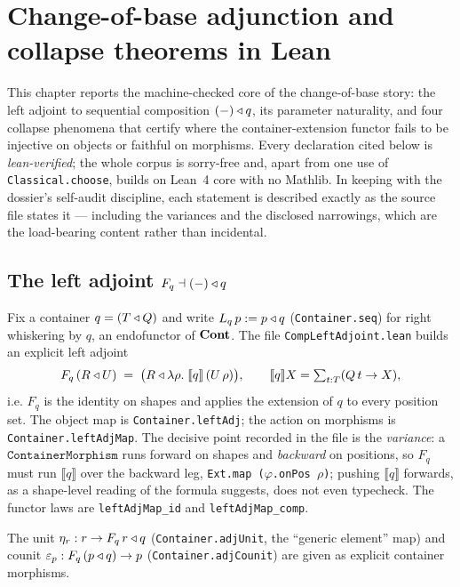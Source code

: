 \chapter{Change-of-base adjunction and collapse theorems in Lean}
\label{ch:leancob}

This chapter reports the machine-checked core of the change-of-base story: the left adjoint to sequential composition $(-)\triangleleft q$, its parameter naturality, and four collapse phenomena that certify where the container-extension functor fails to be injective on objects or faithful on morphisms. Every declaration cited below is \emph{lean-verified}; the whole corpus is sorry-free and, apart from one use of \texttt{Classical.choose}, builds on Lean~4 core with no Mathlib. In keeping with the dossier's self-audit discipline, each statement is described exactly as the source file states it --- including the variances and the disclosed narrowings, which are the load-bearing content rather than incidental.


\section{The left adjoint $F_q \dashv (-)\triangleleft q$}
\label{sec:leancob-fq}

Fix a container $q=(T\triangleleft Q)$ and write $L_q\,p := p\triangleleft q$ (\texttt{Container.seq}) for right whiskering by $q$, an endofunctor of $\mathbf{Cont}$. The file \texttt{CompLeftAdjoint.lean} builds an explicit left adjoint
\[
  F_q\,(R\triangleleft U) \;=\; \bigl(R \triangleleft \lambda\rho.\;\llbracket q\rrbracket\,(U\,\rho)\bigr),
  \qquad \llbracket q\rrbracket X = \textstyle\sum_{t:T}(Q\,t \to X),
\]
i.e. $F_q$ is the identity on shapes and applies the extension of $q$ to every position set. The object map is \texttt{Container.leftAdj}; the action on morphisms is \texttt{Container.leftAdjMap}. The decisive point recorded in the file is the \emph{variance}: a $\texttt{ContainerMorphism}$ runs forward on shapes and \emph{backward} on positions, so $F_q$ must run $\llbracket q\rrbracket$ over the backward leg, \texttt{Ext.map (\(\varphi\).onPos \(\rho\))}; pushing $\llbracket q\rrbracket$ forwards, as a shape-level reading of the formula suggests, does not even typecheck. The functor laws are \texttt{leftAdjMap\_id} and \texttt{leftAdjMap\_comp}.

The unit $\eta_r : r \to F_q\,r \triangleleft q$ (\texttt{Container.adjUnit}, the ``generic element'' map) and counit $\varepsilon_p : F_q\,(p\triangleleft q)\to p$ (\texttt{Container.adjCounit}) are given as explicit container morphisms.

